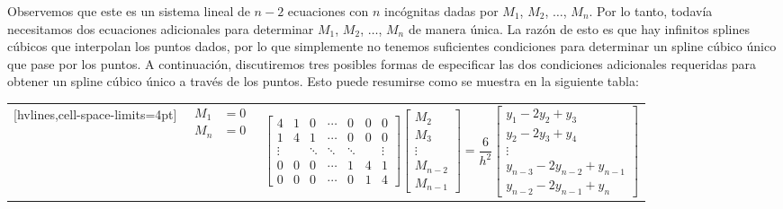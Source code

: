 Observemos que este es un sistema lineal de $n - 2$ ecuaciones con $n$ incógnitas dadas por $M_1$, $M_2$, $\dots$, $M_n$. Por lo tanto, todavía necesitamos dos ecuaciones adicionales para determinar $M_1$, $M_2$, $\dots$, $M_n$ de manera única. La razón de esto es que hay infinitos splines cúbicos que interpolan los puntos dados, por lo que simplemente no tenemos suficientes condiciones para determinar un spline cúbico único que pase por los puntos. A continuación, discutiremos tres posibles formas de especificar las dos condiciones adicionales requeridas para obtener un spline cúbico único a través de los puntos. Esto puede resumirse como se muestra en la siguiente tabla:
\begin{table}[h!]
    \centering
    \begin{NiceTabular}{ccc}[hvlines,cell-space-limits=4pt]
         & $\begin{aligned} M_1 & = 0 \\ M_n & = 0 \end{aligned}$ & $\begin{bmatrix} 4 & 1 & 0 & \cdots & 0 & 0 & 0 \\ 1 & 4 & 1 & \cdots & 0 & 0 & 0 \\ \vdots & & \ddots & \ddots & \ddots & & \vdots \\ 0 & 0 & 0 & \cdots & 1 & 4 & 1 \\ 0 & 0 & 0 & \cdots & 0 & 1 & 4 \end{bmatrix} \begin{bmatrix} M_2 \\ M_3 \\ \vdots \\ M_{n-2} \\ M_{n-1} \end{bmatrix} = \dfrac{6}{h^2} \begin{bmatrix} y_1 - 2y_2 + y_3 \\ y_2 - 2y_3 + y_4 \\ \vdots \\ y_{n-3} - 2y_{n-2} + y_{n-1} \\ y_{n-2} - 2y_{n-1} + y_n \end{bmatrix}$ \\

\end{NiceTabular}
\end{table}
